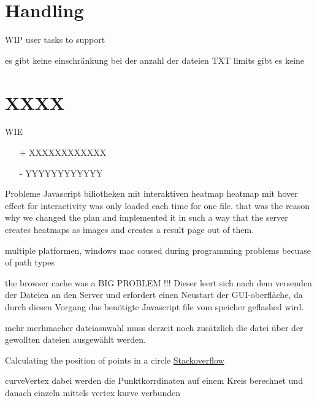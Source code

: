 \documentclass[runningheads]{llncs}
\begin{document}
\section{Handling}


WIP
user tasks to support

es gibt keine einschränkung bei der anzahl der dateien TXT
limits gibt es keine




\section{XXXX}


WIE
\begin{itemize}
    \item[+] XXXXXXXXXXXX
    \item[-] YYYYYYYYYYYY
\end{itemize}


Probleme
Javascript biliotheken mit interaktiven heatmap 
heatmap mit hover effect for interactivity was only loaded each time for one file. 
that was the reason why we changed the plan and implemented it in such a way that the server creates heatmaps as images and creates a result page out of them.

multiple platformen, windows mac coused during programming problems becuase of path types

the browser cache was a BIG PROBLEM !!! Dieser leert sich nach dem versenden der Dateien an den Server und erfordert einen Neustart der GUI-oberfläche, da durch diesen Vorgang das benötigte Javascript file vom speicher geflashed wird.


mehr merhmacher dateiasuwahl muss derzeit noch zusätzlich die datei über der gewollten dateien ausgewählt werden. 


Calculating the position of points in a circle
\href{https://stackoverflow.com/questions/5300938/calculating-the-position-of-points-in-a-circle}{Stackoverflow}


curveVertex
dabei werden die Punktkorrdinaten auf einem Kreis berechnet und danach einzeln mittels vertex kurve verbunden


\end{document}
